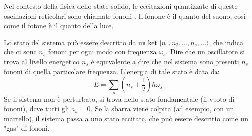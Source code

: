 Nel contesto della fisica dello stato solido, le eccitazioni quantizzate di queste oscillazioni reticolari sono chiamate fononi . Il fonone è il quanto del suono, così come il fotone è il quanto della luce.

Lo stato del sistema può essere descritto da un ket $|n_1, n_2, \dots, n_s, \dots \rangle$, che indica che ci sono $n_s$ fononi per ogni modo con frequenza $\omega_s$. Dire che un oscillatore si trova al livello energetico $n_s$ è equivalente a dire che nel sistema sono presenti $n_s$ fononi di quella particolare frequenza.
L'energia di tale stato è data da:
\begin{equation}
    E = \sum_s \left( n_s + \frac{1}{2} \right) \hbar\omega_s
\end{equation}
Se il sistema non è perturbato, si trova nello stato fondamentale (il vuoto di fononi), dove tutti gli $n_s=0$. Se la sbarra viene colpita (ad esempio, con un martello), il sistema passa a uno stato eccitato, che può essere descritto come un "gas" di fononi.






